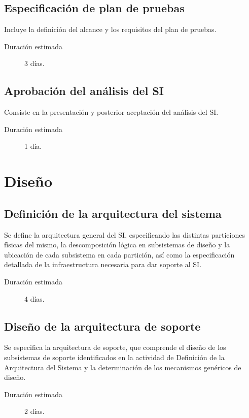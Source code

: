 \documentclass[11pt,a4paper,spanish,twoside]{report}
\begin{document}
\subsection{Especificación de plan de pruebas}
Incluye la definición del alcance y los requisitos del plan de pruebas.
\begin{description}
\item[Duración estimada] 3 días.
\end{description}

\subsection{Aprobación del análisis del SI}
Consiste en la presentación y posterior aceptación del análisis del SI.
\begin{description}
\item[Duración estimada] 1 día.
\end{description}

\section{Diseño}
\subsection{Definición de la arquitectura del sistema}
Se define la arquitectura general del SI, especificando las distintas
particiones físicas del mismo, la descomposición lógica en subsistemas de
diseño y la ubicación de cada subsistema en cada partición, así como la
especificación detallada de la infraestructura necesaria para dar soporte al
SI. 
\begin{description}
\item[Duración estimada] 4 días.
\end{description}

\subsection{Diseño de la arquitectura de soporte}
Se especifica la arquitectura de soporte, que comprende el diseño de los
subsistemas de soporte identificados en la actividad de Definición de la
Arquitectura del Sistema y la determinación de los mecanismos genéricos de
diseño.
\begin{description}
\item[Duración estimada] 2 días.
\end{description}
\end{document}
